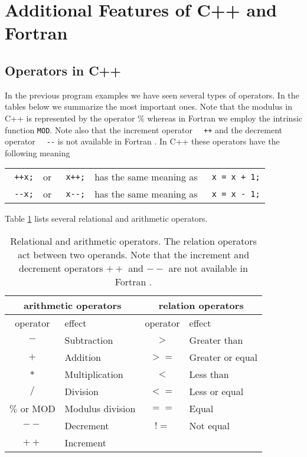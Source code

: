 \section{Additional Features of C++ and Fortran }

\subsection{Operators in C++}
In the previous program examples we have seen several types of operators.
In the tables below we summarize the most important ones. 
Note that the modulus in C++ is represented by the operator 
\% whereas in Fortran  we employ the intrinsic function \verb?MOD?.
Note also that the increment operator \verb?  ++? and the decrement operator
\verb?  --?  is not available in Fortran .
In C++ these operators have the following meaning
%
\begin{center}
\begin{tabular}{ccccc}
\verb? ++x;? & or &\verb? x++;? & has the same meaning as &
\verb? x = x + 1;? \\
\verb? --x;? & or &\verb? x--;? & has the same meaning as &
\verb? x = x - 1;? \\
\end{tabular}
\end{center}
Table \ref{tab:cexpressions1} lists several relational and arithmetic operators.
\begin{table}
\begin{center}
\begin{tabular}{|cl|cl|} \hline
\multicolumn{2}{|c}{arithmetic operators}
& \multicolumn{2}{|c|}{relation operators}\\ \hline
operator & effect& operator& effect\\ \hline
$-$  & Subtraction       & $>$  & Greater than\\
$+$  & Addition          & $>=$ & Greater or equal\\
$*$  & Multiplication    & $<$  & Less than \\
$/$  & Division          & $<=$ & Less or equal\\
$\%$ or MOD & Modulus division & $==$ & Equal\\
$--$ & Decrement         & $!=$ & Not equal\\
$++$ & Increment         &      & \\ \hline 
\end{tabular}
\caption{Relational and arithmetic operators. The relation operators act between 
two operands. Note that the increment 
and decrement operators $++$ and
$--$ are not available in Fortran . \label{tab:cexpressions1}}
\end{center}
\end{table}
